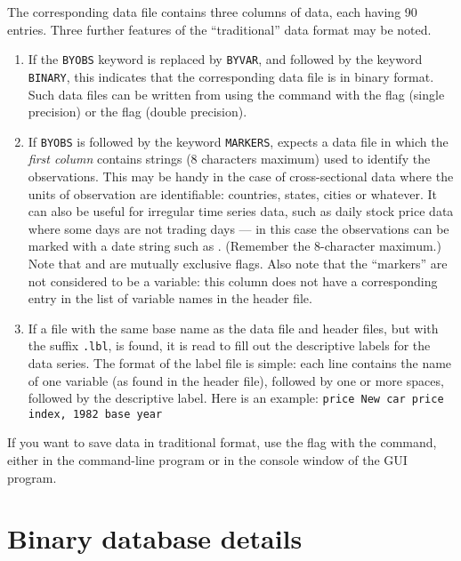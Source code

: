 The corresponding data file contains three columns of data, each
having 90 entries.  Three further features of the ``traditional'' data
format may be noted.
    
\begin{enumerate}
\item If the \verb+BYOBS+ keyword is replaced by \verb+BYVAR+, and
  followed by the keyword \verb+BINARY+, this indicates that the
  corresponding data file is in binary format.  Such data files can be
  written from  using the  command with the
   flag (single precision) or the  flag (double
  precision).
\item If \verb+BYOBS+ is followed by the keyword \verb+MARKERS+,
   expects a data file in which the \emph{first column}
  contains strings (8 characters maximum) used to identify the
  observations.  This may be handy in the case of cross-sectional data
  where the units of observation are identifiable: countries, states,
  cities or whatever.  It can also be useful for irregular time series
  data, such as daily stock price data where some days are not trading
  days --- in this case the observations can be marked with a date
  string such as .  (Remember the 8-character maximum.)
  Note that  and  are mutually exclusive
  flags.  Also note that the ``markers'' are not considered to be a
  variable: this column does not have a corresponding entry in the
  list of variable names in the header file.
\item If a file with the same base name as the data file and header
  files, but with the suffix \verb+.lbl+, is found, it is read to fill
  out the descriptive labels for the data series. The format of the
  label file is simple: each line contains the name of one variable
  (as found in the header file), followed by one or more spaces,
  followed by the descriptive label. Here is an example:
  \verb+price New car price index, 1982 base year+
\end{enumerate}

If you want to save data in traditional format, use the  flag
with the  command, either in the command-line program or in
the console window of the GUI program.


\section{Binary database details}
\label{dbdetails}


